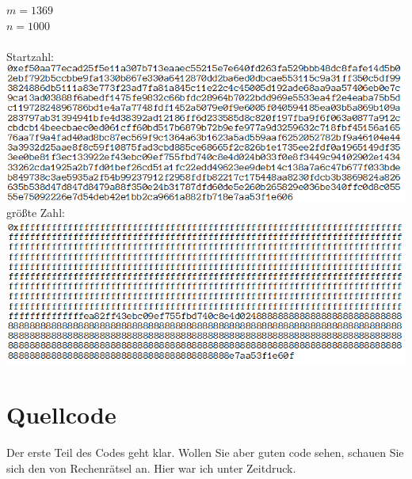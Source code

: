 \documentclass[a4paper,10pt,ngerman]{scrartcl}
\begin{document}
$m=1369$
\\
$n=1000$
\\
\\
Startzahl: 
\\
\includegraphics[width=\textwidth]{solutions/startzahl5.png} 
\\
größte Zahl:
\\
\includegraphics[width=\textwidth]{solutions/endzahl5.png} 




\section{Quellcode}

Der erste Teil des Codes geht klar. Wollen Sie aber guten code sehen, schauen Sie sich den von Rechenrätsel an. Hier war ich unter Zeitdruck.
\end{document}
